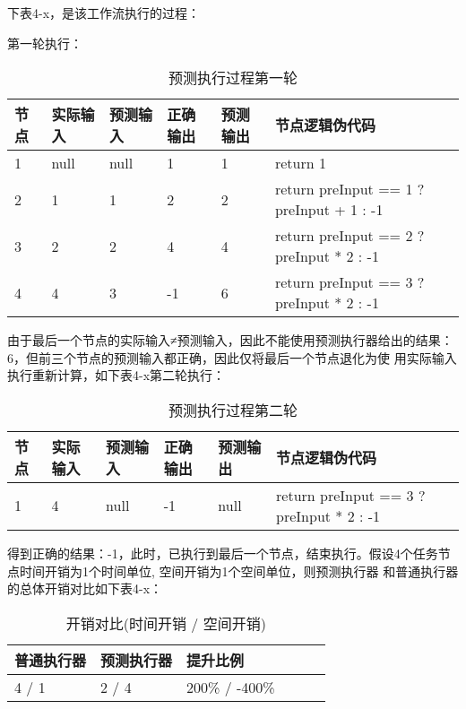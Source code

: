 下表4-x，是该工作流执行的过程：

第一轮执行：
\begin{table}[H]
    \centering
    \caption{预测执行过程第一轮}
    \label{tab:predict_process_1}
    \begin{tabular}{llllll}
        \toprule
        节点 &实际输入 &预测输入 &正确输出 &预测输出 &节点逻辑伪代码\\
        \midrule
        1 &null    &null   &1       &1       &return 1 \\
        2 &1       &1      &2       &2       &return preInput == 1 ? preInput + 1 : -1 \\
        3 &2       &2      &4       &4       &return preInput == 2 ? preInput * 2 : -1 \\
        4 &4       &3      &-1      &6       &return preInput == 3 ? preInput * 2 : -1 \\
        \bottomrule
    \end{tabular}
\end{table}
由于最后一个节点的实际输入≠预测输入，因此不能使用预测执行器给出的结果：6，但前三个节点的预测输入都正确，因此仅将最后一个节点退化为使
用实际输入执行重新计算，如下表4-x第二轮执行：

\begin{table}[H]
    \centering
    \caption{预测执行过程第二轮}
    \label{tab:predict_process_2}
    \begin{tabular}{llllll}
        \toprule
        节点 &实际输入 &预测输入 &正确输出 &预测输出 &节点逻辑伪代码\\
        \midrule
        1 &4       &null      &-1      &null       &return preInput == 3 ? preInput * 2 : -1
    \end{tabular}
\end{table}

得到正确的结果：-1，此时，已执行到最后一个节点，结束执行。假设4个任务节点时间开销为1个时间单位, 空间开销为1个空间单位，则预测执行器
和普通执行器的总体开销对比如下表4-x：

\begin{table}[H]
    \centering
    \caption{开销对比(时间开销 / 空间开销)}
    \label{tab:cost}
    \begin{tabular}{llllll}
        \toprule
        普通执行器 & 预测执行器 & 提升比例 \\
        \midrule
        4 / 1   &2 / 4   &200\% / -400\% \\
        \bottomrule
    \end{tabular}
\end{table}

